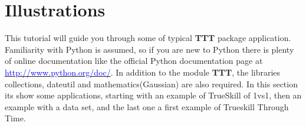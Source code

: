 \documentclass[article]{jss}
\newcommand{\fct}[1]{\code{#1()}}
\begin{document}
\section{Illustrations} \label{sec:illustrations}

%

This tutorial will guide you through some of typical \textbf{TTT} package application.
Familiarity with Python is assumed, so if you are new to Python there is plenty of online documentation like the official Python documentation
page at \href{http://www.python.org/doc/}{\textcolor{blue}{http://www.python.org/doc/}}.
In addition to the module \textbf{TTT}, the libraries collections, dateutil and mathematics(Gaussian) are also required.
In this section its show some applications, starting with an example of TrueSkill of 1vs1, then an example with a data set, and the last one a first example of Trueskill Through Time.
\end{document}
